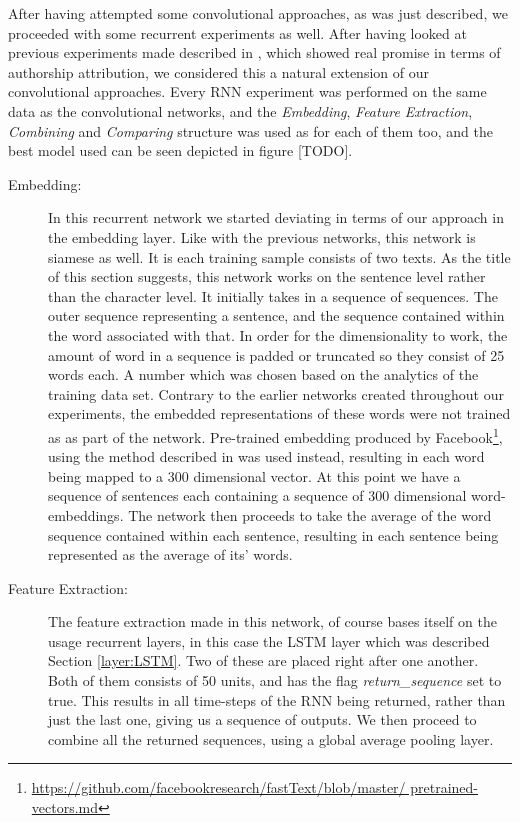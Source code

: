 After having attempted some convolutional approaches, as was just described,
we proceeded with some recurrent experiments as well. After having looked at
previous experiments made described in \cite{qian:2018}, which showed real
promise in terms of authorship attribution, we considered this a natural
extension of our convolutional approaches. Every \gls{RNN} experiment
was performed on the same data as the convolutional networks, and the
\textit{Embedding}, \textit{Feature Extraction}, \textit{Combining} and
\textit{Comparing} structure was used as for each of them too, and the best
model used can be seen depicted in figure [TODO].

\begin{description}

\item[Embedding:] In this recurrent network we started deviating in terms of
our approach in the embedding layer. Like with the previous
networks, this network is siamese as well. It is each training sample
consists of two texts. As the title of this section suggests,
this network works on the sentence level rather than the character level. It
initially takes in a sequence of sequences. The outer sequence representing a
sentence, and the sequence contained within the word associated with that. In
order for the dimensionality to work, the amount of word in a sequence is padded
or truncated so they consist of 25 words each. A number which was chosen based
on the analytics of the training data set. Contrary to the earlier networks
created throughout our experiments, the embedded representations of these words
were not trained as as part of the network. Pre-trained embedding produced by
Facebook\footnote{\url{https://github.com/facebookresearch/fastText/blob/master/
pretrained-vectors.md}}, using the method described in
\cite{bojanowski2016enriching} was used instead, resulting in each word being
mapped to a 300 dimensional vector. At this point we have a sequence of
sentences each containing a sequence of 300 dimensional word-embeddings. The
network then proceeds to take the average of the word sequence contained within
each sentence, resulting in each sentence being represented as the average of
its' words.

\item[Feature Extraction:] The feature extraction made in this network, of
course bases itself on the usage recurrent layers, in this case the \gls{LSTM}
layer which was described Section \ref{layer:LSTM}. Two of these are placed
right after one another. Both of them consists of 50 units, and has the flag
\textit{return\_sequence} set to true. This results in all time-steps of the
\gls{RNN} being returned, rather than just the last one, giving us a sequence of
outputs. We then proceed to combine all the returned sequences, using a global
average pooling layer.


\end{description}
